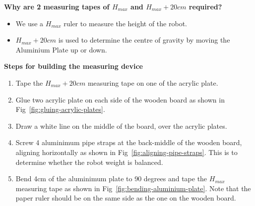 \textbf{Why are 2 measuring tapes of $H_{max}$ and $H_{max}+20cm$ required?}
\begin{itemize}
\item We use a $H_{max}$ ruler to measure the height of the robot.
\item $H_{max}+20cm$ is used to determine the centre of gravity by moving the Aluminium
  Plate up or down.
\end{itemize}

\textbf{Steps for building the measuring device}
\begin{enumerate}
\item Tape the $H_{max}+20cm$ measuring tape on one of the acrylic plate.
\item Glue two acrylic plate on each side of the wooden board as shown in
  Fig~\ref{fig:gluing-acrylic-plates}.
\item Draw a white line on the middle of the board, over the acrylic plates.
\item Screw 4 aluminimum pipe straps at the back-middle of the wooden board,
aligning horizontally as shown in Fig~\ref{fig:aligning-pipe-straps}.
This is to determine whether the robot weight is balanced.
\item Bend 4cm of the aluminimum plate to 90 degrees and tape the $H_{max}$
  measuring tape as shown in Fig~\ref{fig:bending-aluminium-plate}.
  Note that the paper ruler should be on the same side as the one on the wooden
  board.
\end{enumerate}

